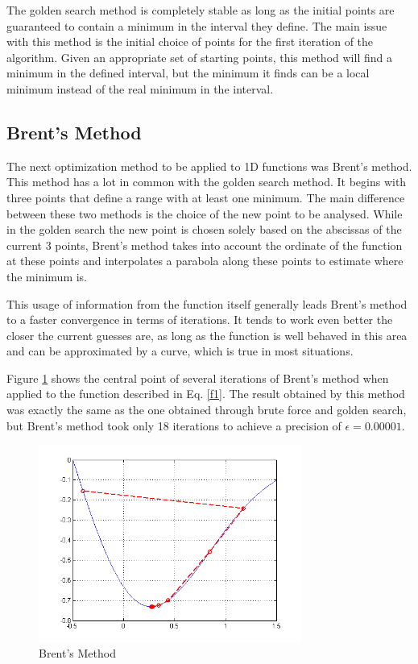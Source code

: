 \documentclass[journal]{IEEEtran}
\begin{document}
The golden search method is completely stable as long as the initial points are guaranteed to contain a minimum in the interval they define. The main issue with this method is the initial choice of points for the first iteration of the algorithm. Given an appropriate set of starting points, this method will find a minimum in the defined interval, but the minimum it finds can be a local minimum instead of the real minimum in the interval.

\subsection{Brent's Method}

The next optimization method to be applied to 1D functions was Brent's method. This method has a lot in common with the golden search method. It begins with three points that define a range with at least one minimum. The main difference between these two methods is the choice of the new point to be analysed. While in the golden search the new point is chosen solely based on the abscissas of the current 3 points, Brent's method takes into account the ordinate of the function at these points and interpolates a parabola along these points to estimate where the minimum is.

This usage of information from the function itself generally leads Brent's method to a faster convergence in terms of iterations. It tends to work even better the closer the current guesses are, as long as the function is well behaved in this area and can be approximated by a curve, which is true in most situations.

Figure \ref{figBM} shows the central point of several iterations of Brent's method when applied to the function described in Eq. \ref{f1}. The result obtained by this method was exactly the same as the one obtained through brute force and golden search, but Brent's method took only 18 iterations to achieve a precision of $\epsilon = 0.00001$.

\begin{figure}[H]
\centering
\includegraphics[width=3.4in]{figures/1d-brentsMethod.png}
\caption{Brent's Method}
\label{figBM}
\end{figure}
\end{document}

